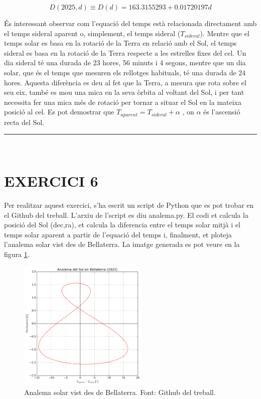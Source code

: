 \documentclass[a4paper, 11pt]{article}
\begin{document}
\begin{equation} \label{D_2025}
    \boxed{D(2025,d) \equiv D(d) = 163.3155293 + 0.01720197d}
\end{equation}
\vspace{2mm}

\noindent És interessant observar com l'equació del temps està relacionada directament amb el temps sideral aparent o, simplement, el temps sideral ($T_{sideral}$). Mentre que el temps solar es basa en la rotació de la Terra en relació amb el Sol, el temps sideral es basa en la rotació de la Terra respecte a les estrelles fixes del cel. Un dia sideral té una durada de 23 hores, 56 minuts i 4 segons, mentre que un dia solar, que és el temps que mesuren els rellotges habituals, té una durada de 24 hores. Aquesta diferència es deu al fet que la Terra, a mesura que rota sobre el seu eix, també es mou una mica en la seva òrbita al voltant del Sol, i per tant necessita fer una mica més de rotació per tornar a situar el Sol en la mateixa posició al cel. Es pot demostrar que $T_{aparent} = T_{sideral} + \alpha$ \cite{EQ_OF_TIME}, on $\alpha$ és l'ascensió recta del Sol.  

\vspace{10mm}
\hrule\
\vspace{5mm}


\section*{EXERCICI 6}

\noindent Per realitzar aquest exercici, s'ha escrit un script de Python que es pot trobar en el Github del treball. L'arxiu de l'script es diu analema.py. El codi et calcula la posició del Sol (dec,ra), et calcula la diferencia entre el temps solar mitjà i el temps solar aparent a partir de l'equació del temps i, finalment, et ploteja l'analema solar vist des de Bellaterra. La imatge generada es pot veure en la figura \ref{fig:analema_codi}.

\begin{figure}[h!]
    \centering
    \includegraphics[width=0.55\textwidth]{images/analema_codi.png}
    \caption{Analema solar vist des de Bellaterra. Font: Github del treball.}
    \label{fig:analema_codi}
\end{figure}
\vspace{2mm}
\end{document}
